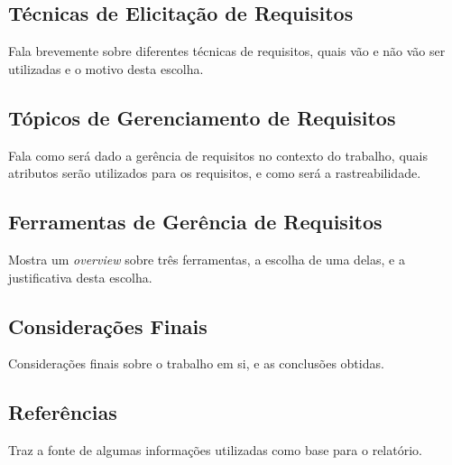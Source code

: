 \subsection{Técnicas de Elicitação de Requisitos}
Fala brevemente sobre diferentes técnicas de requisitos, quais vão e não vão ser utilizadas e o motivo desta escolha.
\subsection{Tópicos de Gerenciamento de Requisitos}
Fala como será dado a gerência de requisitos no contexto do trabalho, quais atributos serão utilizados para os requisitos, e como será a rastreabilidade.
\subsection{Ferramentas de Gerência de Requisitos}
Mostra um \emph{overview} sobre três ferramentas, a escolha de uma delas, e a justificativa desta escolha.
\subsection{Considerações Finais}
Considerações finais sobre o trabalho em si, e as conclusões obtidas.
\subsection{Referências}
Traz a fonte de algumas informações utilizadas como base para o relatório.
